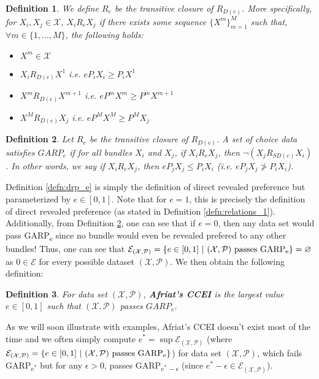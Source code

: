 \documentclass{article} %
\newtheorem{definition}{Definition} %
\theoremstyle{example}
\begin{document}
\begin{definition}\label{defn:rp_e}\leavevmode
We define $R_e$ be the transitive closure of $R_{D(e)}$. More specifically, for $X_i,X_j\in\mathcal{X}$, $X_iR_eX_j$ if there exists some sequence $\{X^m\}_{m=1}^M$ such that, $\forall m\in\{1,\ldots,M\}$, the following holds:
\begin{itemize}[topsep=0pt]
  \item $X^m\in\mathcal{X}$
  \item $X_i R_{D(e)} X^1$ i.e. $eP_iX_i\geq P_i X^1$
  \item $X^m R_{D(e)} X^{m+1}$ i.e. $e P^m X^m \geq P^m X^{m+1}$
  \item $X^M R_{D(e)}X_j$ i.e. $e P^M X^M\geq P^M X_j$
\end{itemize}  
\end{definition}

\begin{definition}\label{defn:GARPe}
Let $R_e$ be the transitive closure of $R_{D(e)}$. A set of choice data satisfies $GARP_e$ if for all bundles $X_i$ and $X_j$, if $X_i R_e X_j$, then $\neg (X_j R_{SD(e)} X_i)$. In other words, we say if $X_i R_e X_j$, then $eP_jX_j \leq P_iX_i$ (i.e. $eP_jX_j \not> P_iX_i$).
\end{definition}
Definition \ref{defn:drp_e} is simply the definition of direct revealed preference but parameterized by $e\in[0,1]$. Note that for $e=1$, this is precisely the definition of direct revealed preference (as stated in Definition \ref{defn:relations_1}). Additionally, from Definition \ref{defn:GARPe}, one can see that if $e=0$, then any data set would pass GARP\textsubscript{e} since no bundle would even be revealed prefered to any other bundles! Thus, one can see that $\mathcal{E}_{(\mathcal{X},\mathcal{P})}=\{e\in[0,1]\ |\ (\mathcal{X},\mathcal{P})\textrm{ passes GARP\textsubscript{e}}\}=\varnothing$ as $0\in\mathcal{E}$ for every possible dataset $(\mathcal{X},\mathcal{P})$. We then obtain the following definition:

\begin{definition}\label{defn:Afriat_CCEI}
For data set $(\mathcal{X},\mathcal{P})$, \textbf{Afriat's CCEI} is the \emph{largest} value $e\in[0,1]$ such that $(\mathcal{X},\mathcal{P})$ passes $GARP_e$.
\end{definition}
As we will soon illustrate with examples, Afriat's CCEI doesn't exist most of the time and we often simply compute $e^*=\sup \mathcal{E}_{(\mathcal{X},\mathcal{P})}$ (where $\mathcal{E}_{(\mathcal{X},\mathcal{P})}=\{e\in[0,1]\ |\ (\mathcal{X},\mathcal{P})\textrm{ passes GARP\textsubscript{e}}\}$) for data set $(\mathcal{X},\mathcal{P})$, which fails GARP\textsubscript{$e^*$} but for any $\epsilon>0$, passes GARP\textsubscript{$e^*-\epsilon$} (since $e^*-\epsilon\in \mathcal{E}_{(\mathcal{X},\mathcal{P})}$).
\end{document}
